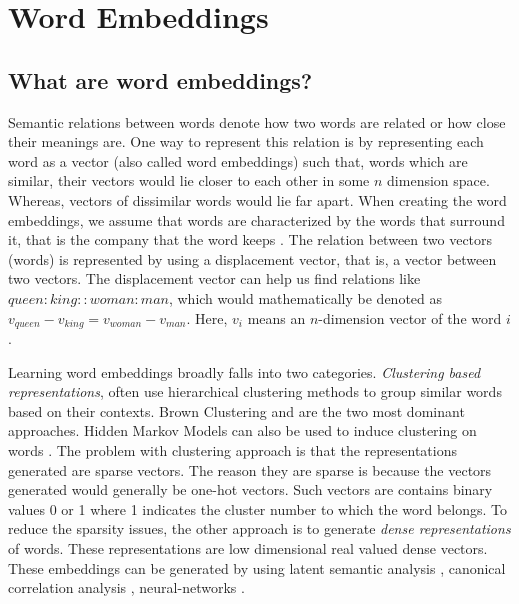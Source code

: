 
%
%

\chapter{Word Embeddings}
\label{wordvizChapter}

\section{What are word embeddings?}\label{intro-biembedding}
Semantic relations between words denote how two words are related or how close their meanings are. One way to represent this relation is by representing each word as a vector (also called word embeddings) such that, words which are similar, their vectors would lie closer to each other in some $n$ dimension space. Whereas, vectors of dissimilar words would lie far apart. When creating the word embeddings, we assume that words are characterized by the words that surround it, that is the company that the word keeps \cite{Harris1954}. The relation between two vectors (words) is represented by using a displacement vector, that is, a vector between two vectors. The displacement vector can help us find relations like $queen : king :: woman : man$, which would mathematically be denoted as $v_{queen} - v_{king} = v_{woman} - v_{man}$. Here, $v_{i}$ means an $n$-dimension vector of the word $i$. 

Learning word embeddings broadly falls into two categories. \textit{Clustering  based representations}, often use hierarchical clustering methods to group similar words based on their contexts. Brown Clustering \cite{Brown1992} and \cite{Pereira1993} are the two most dominant approaches. Hidden Markov Models can also be used to induce clustering on words \cite{Huang2009}. The problem with clustering approach is that the representations generated are sparse vectors. The reason they are sparse is because the vectors generated would generally be one-hot vectors. Such vectors are contains binary values 0 or 1 where 1 indicates the cluster number to which the word belongs. To reduce the sparsity issues, the other approach is to generate \textit{dense representations} of words. These representations are low dimensional real valued dense vectors. These embeddings can be generated by using latent semantic analysis \cite{Deerwester1990}, canonical correlation analysis \cite{Dhillon2011}, neural-networks \cite{Collobert2008, Huang2012, Mikolov2013a, Mikolov2013b}.

